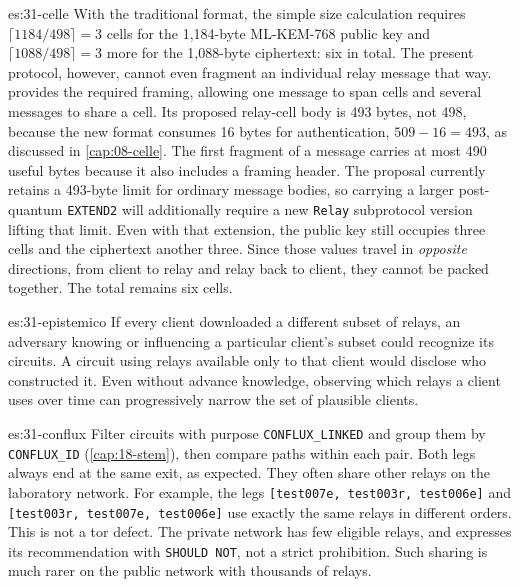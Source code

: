 \begin{soluzione}{es:31-celle}
With the traditional format, the simple size calculation requires $\lceil 1184/498 \rceil = 3$ cells for the 1,184-byte ML-KEM-768 public key and $\lceil 1088/498 \rceil = 3$ more for the 1,088-byte ciphertext: six in total. The present protocol, however, cannot even fragment an individual relay message that way.  provides the required framing, allowing one message to span cells and several messages to share a cell. Its proposed relay-cell body is 493 bytes, not 498, because the new format consumes 16 bytes for authentication, $509 - 16 = 493$, as discussed in \cref{cap:08-celle}. The first fragment of a message carries at most 490 useful bytes because it also includes a framing header. The proposal currently retains a 493-byte limit for ordinary message bodies, so carrying a larger post-quantum \texttt{EXTEND2} will additionally require a new \texttt{Relay} subprotocol version lifting that limit. Even with that extension, the public key still occupies three cells and the ciphertext another three. Since those values travel in \emph{opposite} directions, from client to relay and relay back to client, they cannot be packed together. The total remains six cells.
\end{soluzione}

\begin{soluzione}{es:31-epistemico}
If every client downloaded a different subset of relays, an adversary knowing or influencing a particular client's subset could recognize its circuits. A circuit using relays available only to that client would disclose who constructed it. Even without advance knowledge, observing which relays a client uses over time can progressively narrow the set of plausible clients.
\end{soluzione}

\begin{soluzione}{es:31-conflux}
Filter circuits with purpose \texttt{CONFLUX\_LINKED} and group them by \texttt{CONFLUX\_ID} (\cref{cap:18-stem}), then compare paths within each pair. Both legs always end at the same exit, as expected. They often share other relays on the laboratory network. For example, the legs \texttt{[test007e, test003r, test006e]} and \texttt{[test003r, test007e, test006e]} use exactly the same relays in different orders. This is not a tor defect. The private network has few eligible relays, and  expresses its recommendation with \texttt{SHOULD NOT}, not a strict prohibition. Such sharing is much rarer on the public network with thousands of relays.
\end{soluzione}

